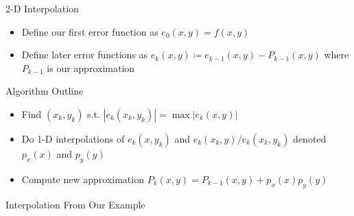 \documentclass[xcolor={rgb,dvipsnames}]{beamer}		%
\begin{document}



\begin{frame}{2-D Interpolation}
\begin{itemize}
\item Define our first error function as $e_0(x,y)=f(x,y)$ 
\item Define later error functions as $e_k(x,y)\coloneqq e_{k-1}(x,y)-P_{k-1}(x,y)$ where $P_{k-1}$ is our approximation
\end{itemize}
\begin{block}{Algorithm Outline}
\begin{itemize}
\item Find $(x_k,y_k)$ s.t.  $|e_k(x_k,y_k)|=\max|e_k(x,y)|$
\item Do 1-D interpolations of $e_k(x,y_k)$ and $e_k(x_k,y)/e_k(x_k,y_k)$ denoted $p_x(x)$ and $p_y(y)$
\item Compute new approximation $P_{k}(x,y) = P_{k-1}(x,y)+ p_x(x)p_y(y)$
\end{itemize}
\end{block}
\end{frame}

\begin{frame}{Interpolation From Our Example}
    \centering
\end{frame}
\end{document}

